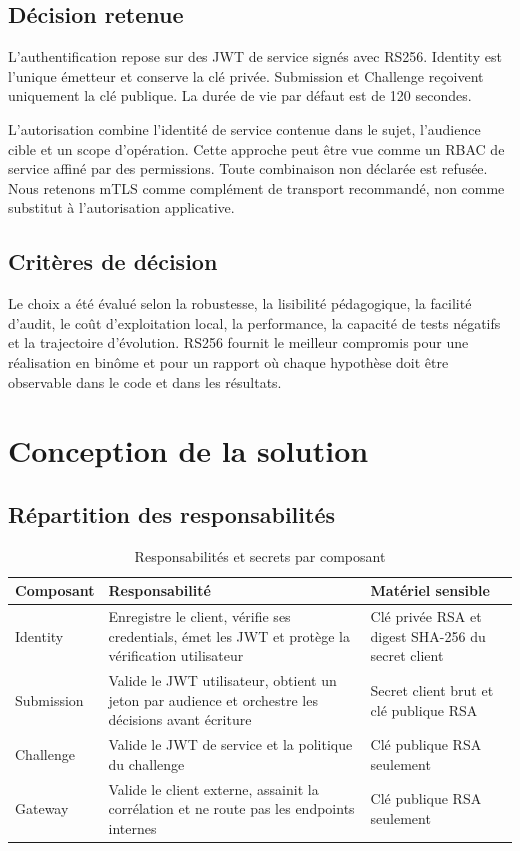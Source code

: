 \documentclass[12pt,a4paper,oneside]{report}
\begin{document}
\section{Décision retenue}
L'authentification repose sur des JWT de service signés avec RS256. Identity est
l'unique émetteur et conserve la clé privée. Submission et Challenge reçoivent
uniquement la clé publique. La durée de vie par défaut est de 120 secondes.

L'autorisation combine l'identité de service contenue dans le sujet, l'audience
cible et un scope d'opération. Cette approche peut être vue comme un RBAC de
service affiné par des permissions. Toute combinaison non déclarée est refusée.
Nous retenons mTLS comme complément de transport recommandé, non comme substitut
à l'autorisation applicative.

\section{Critères de décision}
Le choix a été évalué selon la robustesse, la lisibilité pédagogique, la facilité
d'audit, le coût d'exploitation local, la performance, la capacité de tests
négatifs et la trajectoire d'évolution. RS256 fournit le meilleur compromis pour
une réalisation en binôme et pour un rapport où chaque hypothèse doit être
observable dans le code et dans les résultats.

\chapter{Conception de la solution}

\section{Répartition des responsabilités}
\begin{table}[H]
\centering
\caption{Responsabilités et secrets par composant}
\label{tab:responsibilities}
\small
\begin{tabularx}{\textwidth}{P{2.5cm}Y Y}
\toprule
\textbf{Composant} & \textbf{Responsabilité} & \textbf{Matériel sensible} \\
\midrule
Identity & Enregistre le client, vérifie ses credentials, émet les JWT et protège la vérification utilisateur & Clé privée RSA et digest SHA-256 du secret client \\
Submission & Valide le JWT utilisateur, obtient un jeton par audience et orchestre les décisions avant écriture & Secret client brut et clé publique RSA \\
Challenge & Valide le JWT de service et la politique du challenge & Clé publique RSA seulement \\
Gateway & Valide le client externe, assainit la corrélation et ne route pas les endpoints internes & Clé publique RSA seulement \\
\bottomrule
\end{tabularx}
\end{table}
\end{document}
